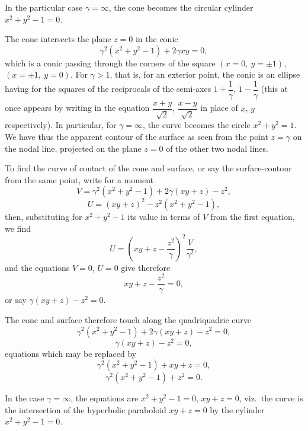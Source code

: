 \documentclass[11pt,a4paper]{article}
\begin{document}
\medskip

In the particular case $\gamma = \infty$, the cone becomes the circular cylinder $x^{2} + y^{2} - 1 = 0$.

\medskip

The cone intersects the plane $z = 0$ in the conic
\[
\gamma^{2}(x^{2} + y^{2} - 1) + 2\gamma xy = 0,
\]
which is a conic passing through the corners of the square $(x = 0,\ y = \pm 1)$, $(x = \pm 1,\ y = 0)$. For $\gamma > 1$, that is, for an exterior point, the conic is an ellipse having for the squares of the reciprocals of the semi-axes $1 + \dfrac{1}{\gamma}$, $1 - \dfrac{1}{\gamma}$ (this at once appears by writing in the equation $\dfrac{x + y}{\sqrt{2}}$, $\dfrac{x - y}{\sqrt{2}}$ in place of $x$, $y$ respectively). In particular, for $\gamma = \infty$, the curve becomes the circle $x^{2} + y^{2} = 1$. We have thus the apparent contour of the surface as seen from the point $z = \gamma$ on the nodal line, projected on the plane $z = 0$ of the other two nodal lines.

\medskip

To find the curve of contact of the cone and surface, or say the surface-contour from the same point, write for a moment
\[
V = \gamma^{2}(x^{2} + y^{2} - 1) + 2\gamma(xy + z) - z^{2},
\]
\[
U = (xy + z)^{2} - z^{2}(x^{2} + y^{2} - 1),
\]
then, substituting for $x^{2} + y^{2} - 1$ its value in terms of $V$ from the first equation, we find
\[
U = \left(xy + z - \frac{z^{2}}{\gamma}\right)^{2} \frac{V}{\gamma^{2}},
\]
and the equations $V = 0$, $U = 0$ give therefore
\[
xy + z - \frac{z^{2}}{\gamma} = 0,
\]
or say $\gamma(xy + z) - z^{2} = 0$.

The cone and surface therefore touch along the quadriquadric curve
\[
\gamma^{2}(x^{2} + y^{2} - 1) + 2\gamma(xy + z) - z^{2} = 0,
\]
\[
\gamma(xy + z) - z^{2} = 0,
\]
equations which may be replaced by
\[
\gamma^{2}(x^{2} + y^{2} - 1) + xy + z = 0,
\]
\[
\gamma^{2}(x^{2} + y^{2} - 1) + z^{2} = 0.
\]

\medskip

In the case $\gamma = \infty$, the equations are $x^{2} + y^{2} - 1 = 0$, $xy + z = 0$, viz.\ the curve is the intersection of the hyperbolic paraboloid $xy + z = 0$ by the cylinder $x^{2} + y^{2} - 1 = 0$.

\bigskip

\end{document}
